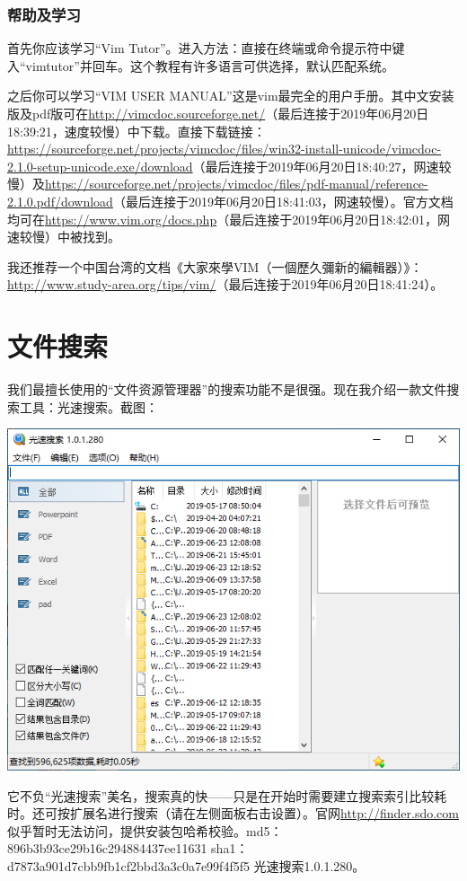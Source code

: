 \subsubsection{帮助及学习}
首先你应该学习“Vim Tutor”。进入方法：直接在终端或命令提示符中键入“vimtutor”并回车。这个教程有许多语言可供选择，默认匹配系统。\par
之后你可以学习“VIM USER MANUAL”这是vim最完全的用户手册。其中文安装版及pdf版可在\url{http://vimcdoc.sourceforge.net/}（最后连接于2019年06月20日18:39:21，速度较慢）中下载。直接下载链接：\url{https://sourceforge.net/projects/vimcdoc/files/win32-install-unicode/vimcdoc-2.1.0-setup-unicode.exe/download}（最后连接于2019年06月20日18:40:27，网速较慢）及\url{https://sourceforge.net/projects/vimcdoc/files/pdf-manual/reference-2.1.0.pdf/download}（最后连接于2019年06月20日18:41:03，网速较慢）。官方文档均可在\url{https://www.vim.org/docs.php}（最后连接于2019年06月20日18:42:01，网速较慢）中被找到。\par
我还推荐一个中国台湾的文档《大家來學VIM（一個歷久彌新的編輯器）》：\url{http://www.study-area.org/tips/vim/}（最后连接于2019年06月20日18:41:24）。
\section{文件搜索}
我们最擅长使用的“文件资源管理器”的搜索功能不是很强。现在我介绍一款文件搜索工具：光速搜索。截图：
\begin{center}
	\includegraphics[scale=0.35]{pic/finder}
\end{center} \par
它不负“光速搜索”美名，搜索真的快——只是在开始时需要建立搜索索引比较耗时。还可按扩展名进行搜索（请在左侧面板右击设置）。官网\url{http://finder.sdo.com}似乎暂时无法访问，提供安装包哈希校验。md5：896b3b93ce29b16c294884437ee11631 sha1：d7873a901d7cbb9fb1cf2bbd3a3c0a7e99f4f5f5 光速搜索1.0.1.280。
